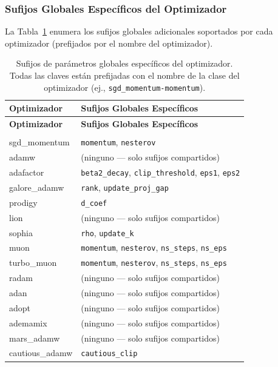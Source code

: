 \subsubsection{Sufijos Globales Específicos del Optimizador}

La Tabla~\ref{tab:optimizer-specific-suffixes} enumera los sufijos globales adicionales soportados por cada optimizador (prefijados por el nombre del optimizador).

\begin{longtable}{>{\ttfamily}l>{\raggedright\arraybackslash}p{10cm}}
\toprule
\textbf{Optimizador} & \textbf{Sufijos Globales Específicos} \\
\midrule
\endfirsthead
\toprule
\textbf{Optimizador} & \textbf{Sufijos Globales Específicos} \\
\midrule
\endhead
\midrule
\multicolumn{2}{r}{\textit{continúa en la página siguiente}} \\
\endfoot
\bottomrule
\caption{Sufijos de parámetros globales específicos del optimizador. Todas las claves están prefijadas con el nombre de la clase del optimizador (ej., \texttt{sgd\_momentum-momentum}).}
\label{tab:optimizer-specific-suffixes}
\endlastfoot
sgd\_momentum & \texttt{momentum}, \texttt{nesterov} \\
adamw & (ninguno --- solo sufijos compartidos) \\
adafactor & \texttt{beta2\_decay}, \texttt{clip\_threshold}, \texttt{eps1}, \texttt{eps2} \\
galore\_adamw & \texttt{rank}, \texttt{update\_proj\_gap} \\
prodigy & \texttt{d\_coef} \\
lion & (ninguno --- solo sufijos compartidos) \\
sophia & \texttt{rho}, \texttt{update\_k} \\
muon & \texttt{momentum}, \texttt{nesterov}, \texttt{ns\_steps}, \texttt{ns\_eps} \\
turbo\_muon & \texttt{momentum}, \texttt{nesterov}, \texttt{ns\_steps}, \texttt{ns\_eps} \\
radam & (ninguno --- solo sufijos compartidos) \\
adan & (ninguno --- solo sufijos compartidos) \\
adopt & (ninguno --- solo sufijos compartidos) \\
ademamix & (ninguno --- solo sufijos compartidos) \\
mars\_adamw & (ninguno --- solo sufijos compartidos) \\
cautious\_adamw & \texttt{cautious\_clip} \\

\end{longtable}
